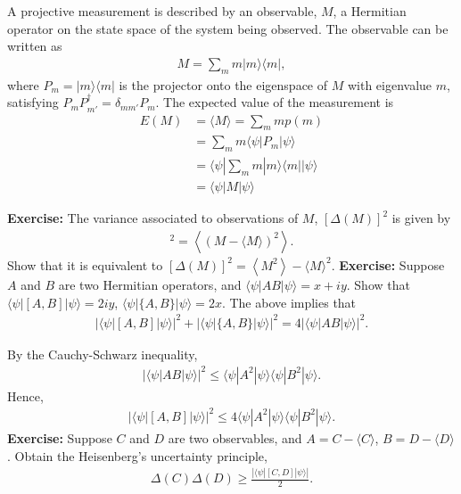 \documentclass{beamer}
\begin{document}
\begin{frame}
\justify
A projective measurement is described by an observable, $M$, a Hermitian operator on the state space of the system being observed. The observable can be written as
\begin{align}
M = \sum_m m |m\rangle \langle m|,
\end{align}
where $P_m = |m\rangle \langle m|$ is the projector onto the eigenspace of $M$ with eigenvalue $m$, satisfying $P_m P_{m'}^\dagger = \delta_{m m'}P_m$.
\vfill
The expected value of the measurement is
\begin{align}
E(M) & = \langle M \rangle = \sum_m m p(m) \nonumber \\
& = \sum_m m \langle \psi | P_m | \psi \rangle  \nonumber \\
& = \langle \psi | \sum_m m |m\rangle \langle m| | \psi \rangle  \nonumber \\
& = \langle \psi | M | \psi \rangle
\end{align}
\end{frame}

\begin{frame}
\textbf{Exercise:} The variance associated to observations of $M$, $[\Delta(M)]^2$ is given by
\begin{align}
[\Delta(M)]^2 = \left\langle \left(M - \langle M \rangle \right)^2 \right\rangle.
\end{align}
Show that it is equivalent to $[\Delta(M)]^2 = \left\langle M^2 \right\rangle - \langle M \rangle^2$.
\vfill
\textbf{Exercise:} Suppose $A$ and $B$ are two Hermitian operators, and $\langle \psi | AB |\psi \rangle = x + iy$. Show that $\langle \psi | [A,B] |\psi \rangle = 2iy$, $\langle \psi | \{A,B\} |\psi \rangle = 2x$.
\vfill
The above implies that
\begin{align}
|\langle \psi|[A,B]|\psi\rangle|^2 + |\langle \psi|\{A,B\}|\psi\rangle|^2 = 4 |\langle \psi|AB|\psi\rangle|^2.
\end{align}
\end{frame}

\begin{frame}
\justify
By the Cauchy-Schwarz inequality,
\begin{align}
|\langle \psi|AB|\psi\rangle|^2 \leq \langle \psi | A^2 |\psi \rangle \langle \psi | B^2 |\psi \rangle.
\end{align}
\vfill
Hence,
\begin{align}
|\langle \psi|[A,B]|\psi\rangle|^2 \leq 4 \langle \psi | A^2 |\psi \rangle \langle \psi | B^2 |\psi \rangle.
\end{align}
\vfill
\textbf{Exercise:} Suppose $C$ and $D$ are two observables, and $A=C-\langle C \rangle$, $B = D - \langle D \rangle$. Obtain the Heisenberg's uncertainty principle,
\begin{align}
\Delta(C) \Delta(D) \geq \frac{|\langle \psi |[C,D]|\psi\rangle|}{2}.
\end{align}
\vfill
\end{frame}
\end{document}
